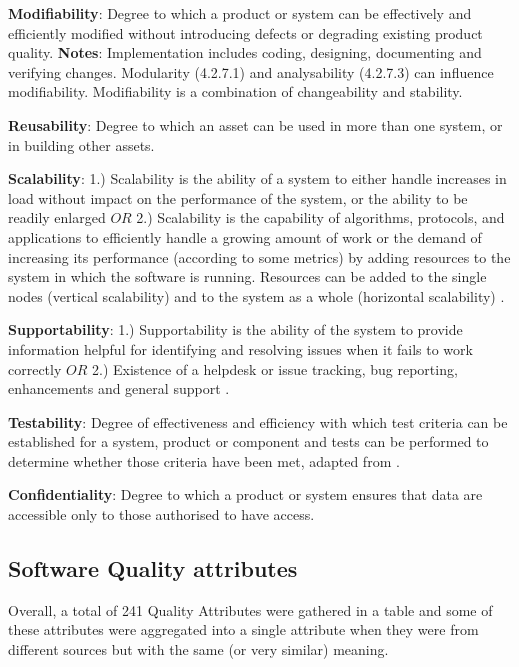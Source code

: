 \textbf{Modifiability}: Degree to which a product or system can be effectively and efficiently modified without introducing defects or degrading existing product quality. \textbf{Notes}: Implementation includes coding, designing, documenting and verifying changes. Modularity (4.2.7.1) and analysability (4.2.7.3) can influence modifiability. Modifiability is a combination of changeability and stability.

\textbf{Reusability}: Degree to which an asset can be used in more than one system, or in building other assets.

\textbf{Scalability}: 1.) Scalability is the ability of a system to either handle increases in load without impact on the performance of the system, or the ability to be readily enlarged \cite{microsoft_2010} $OR$ 2.) Scalability is the capability of algorithms, protocols, and applications to efficiently handle a growing amount of work or the demand of increasing its performance (according to some metrics) by adding resources to the system in which the software is running. Resources can be added to the single nodes (vertical scalability) and to the system as a whole (horizontal scalability) \cite{bondi_2000}.

\textbf{Supportability}: 1.) Supportability is the ability of the system to provide information helpful for identifying and resolving issues when it fails to work correctly \cite{microsoft_2010} $OR$ 2.) Existence of a helpdesk or issue tracking, bug reporting, enhancements and general support \cite{orviz_fernandez_eosc-synergy_2020}.

\textbf{Testability}: Degree of effectiveness and efficiency with which test criteria can be established for a system, product or component and tests can be performed to determine whether those criteria have been met, adapted from \cite{iso_central_secretary_isoiecieee_2010}.

\textbf{Confidentiality}: Degree to which a product or system ensures that data are accessible only to those authorised to have access.

\subsection{Software Quality attributes}
\label{sec:SW_quality_attributes}

Overall, a total of 241 Quality Attributes were gathered in a table and some of these attributes were aggregated into a single attribute when they were from different sources but with the same (or very similar) meaning.


